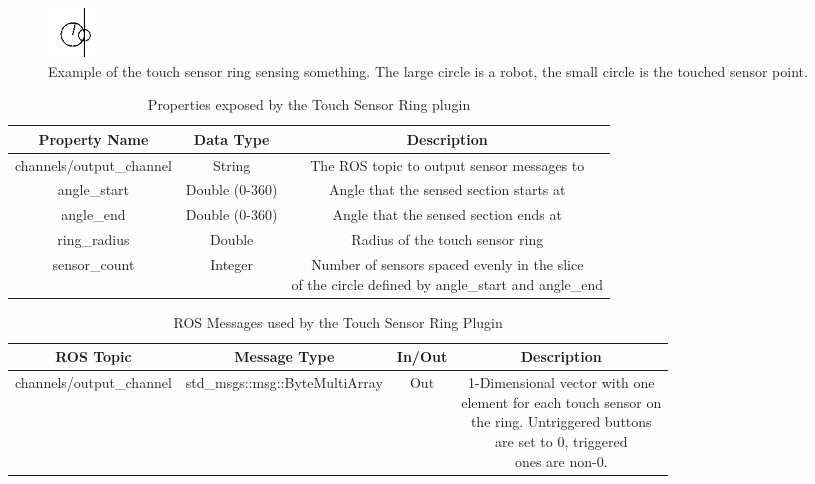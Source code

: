 \begin{itemize}
	\begin{figure}[h]
		\centering
		\includegraphics{./images_design/touch_sensor}
		\caption{Example of the touch sensor ring sensing something. The large circle is a robot, the small circle is the touched sensor point.}
		\label{fig:touchsensorexample}
	\end{figure}
\begin{table}[h!]
	\centering
	\caption{Properties exposed by the Touch Sensor Ring plugin}
	\label{tab:touch_ring_props}
	\begin{tabular}{c|c|c}
	Property Name & Data Type & Description\\ \hline \hline
	channels/output\_channel & String & The ROS topic to output sensor messages to\\ \hline
	angle\_start & Double (0-360) & Angle that the sensed section starts at\\ \hline
	angle\_end & Double (0-360) & Angle that the sensed section ends at\\ \hline
	ring\_radius & Double & Radius of the touch sensor ring\\ \hline
	sensor\_count & Integer & \makecell{Number of sensors spaced evenly in the slice\\ of the circle defined by angle\_start and angle\_end}
	\end{tabular}
\end{table}
\begin{table}[h!]
	\centering
	\caption{ROS Messages used by the Touch Sensor Ring Plugin}
	\label{tab:touch_ring_msgs}
	\begin{tabular}{c|c|c|c}
	ROS Topic & Message Type & In/Out & Description\\ \hline \hline
	channels/output\_channel & std\_msgs::msg::ByteMultiArray & Out & \makecell{1-Dimensional vector with one\\ element for each touch sensor on\\ the ring. Untriggered buttons\\ are set to 0, triggered\\ ones are non-0.}
	\end{tabular}
\end{table}

\end{itemize}
